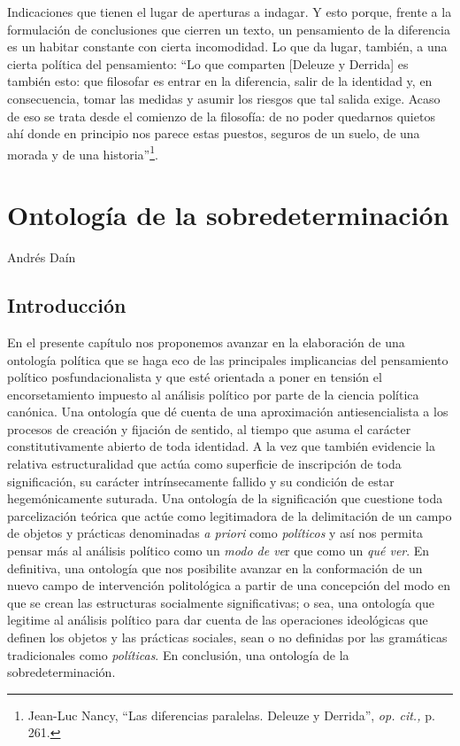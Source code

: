 Indicaciones que tienen el lugar de aperturas a indagar. Y esto porque, frente a la formulación de conclusiones que cierren un texto, un pensamiento de la diferencia es un habitar constante con cierta incomodidad. Lo que da lugar, también, a una cierta política del pensamiento: \enquote{Lo que comparten {[}Deleuze y Derrida{]} es también esto: que filosofar es entrar en la diferencia, salir de la identidad y, en consecuencia, tomar las medidas y asumir los riesgos que tal salida exige. Acaso de eso se trata desde el comienzo de la filosofía: de no poder quedarnos quietos ahí donde en principio nos parece estas puestos, seguros de un suelo, de una morada y de una historia}\footnote{Jean-Luc Nancy, \enquote{Las diferencias paralelas. Deleuze y Derrida}, \emph{op. cit.,} p. 261.}.

\chapter{Ontología de la sobredeterminación}

Andrés Daín

\section{Introducción}

En el presente capítulo nos proponemos avanzar en la elaboración de una ontología política que se haga eco de las principales implicancias del pensamiento político posfundacionalista y que esté orientada a poner en tensión el encorsetamiento impuesto al análisis político por parte de la ciencia política canónica. Una ontología que dé cuenta de una aproximación antiesencialista a los procesos de creación y fijación de sentido, al tiempo que asuma el carácter constitutivamente abierto de toda identidad. A la vez que también evidencie la relativa estructuralidad que actúa como superficie de inscripción de toda significación, su carácter intrínsecamente fallido y su condición de estar hegemónicamente suturada. Una ontología de la significación que cuestione toda parcelización teórica que actúe como legitimadora de la delimitación de un campo de objetos y prácticas denominadas \emph{a priori} como \emph{políticos} y así nos permita pensar más al análisis político como un \emph{modo de ve}r que como un \emph{qué ver}. En definitiva, una ontología que nos posibilite avanzar en la conformación de un nuevo campo de intervención politológica a partir de una concepción del modo en que se crean las estructuras socialmente significativas; o sea, una ontología que legitime al análisis político para dar cuenta de las operaciones ideológicas que definen los objetos y las prácticas sociales, sean o no definidas por las gramáticas tradicionales como \emph{políticas}. En conclusión, una ontología de la sobredeterminación.

